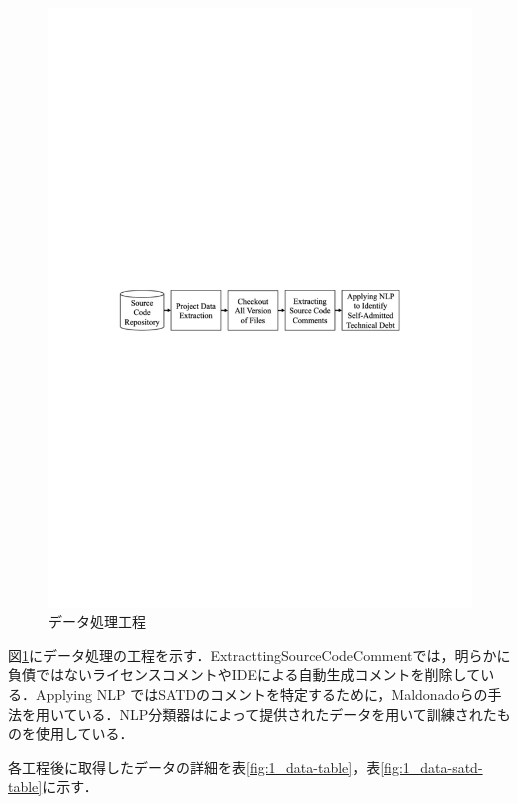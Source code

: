 \begin{figure}[t]
    \centering
    \includegraphics[width=0.9\linewidth, angle=0]{./thesis1/data-preprocess1.pdf}
    \caption{データ処理工程}
    \label{fig:1_data-preprocess}
\end{figure}

図\ref{fig:1_data-preprocess}にデータ処理の工程を示す．ExtracttingSourceCodeCommentでは，明らかに負債ではないライセンスコメントやIDEによる自動生成コメントを削除している．Applying NLP ではSATDのコメントを特定するために，Maldonadoら\cite{1-ref-25}の手法を用いている．NLP分類器は\cite{1-ref-25}によって提供されたデータを用いて訓練されたものを使用している．

各工程後に取得したデータの詳細を表\ref{fig:1_data-table}，表\ref{fig:1_data-satd-table}に示す．

